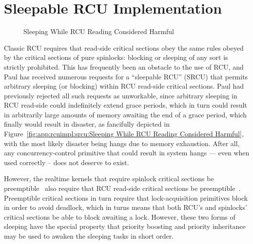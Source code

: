 
\section{Sleepable RCU Implementation}
\label{app:rcuimpl:Sleepable RCU Implementation}

\begin{figure}[tb]
\begin{center}
\end{center}
\caption{Sleeping While RCU Reading Considered Harmful}
\end{figure}

Classic RCU requires that read-side critical sections
obey the same rules
obeyed by the critical sections of pure spinlocks: blocking or sleeping
of any sort is strictly prohibited.
This has frequently been an obstacle to the use of RCU, and
Paul has received numerous requests for a ``sleepable RCU'' (SRCU) that
permits arbitrary sleeping (or blocking) within RCU read-side critical
sections.
Paul had previously rejected all such requests as unworkable, since arbitrary
sleeping in RCU read-side could indefinitely extend grace periods, which
in turn could result in arbitrarily large amounts of memory awaiting the
end of a grace period, which finally would result in disaster,
as fancifully depicted in
Figure~\ref{fig:app:rcuimpl:srcu:Sleeping While RCU Reading Considered Harmful},
with the most likely disaster being hangs due to memory exhaustion.
After all, any concurrency-control primitive that could result in
system hangs --- even when used correctly -- does not deserve to exist.

However, the realtime kernels that require spinlock critical sections
be preemptible~\cite{IngoMolnar05a} also require that RCU read-side critical
sections be preemptible~\cite{PaulMcKenney05b}.
Preemptible critical sections in turn require that lock-acquisition
primitives block in order to avoid deadlock,
which in turns means that both RCU's and spinlocks'
critical sections be able to block awaiting a lock.
However, these two forms of sleeping have the special property that
priority boosting and priority inheritance may be used to awaken
the sleeping tasks in short order.


